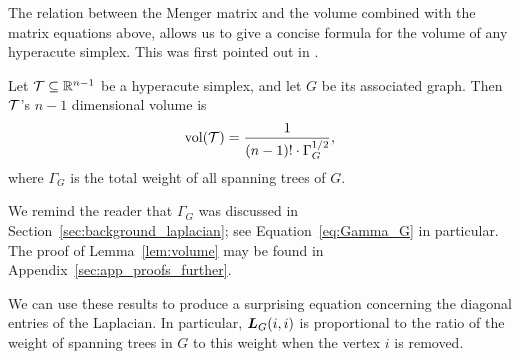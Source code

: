 The relation between the Menger matrix and the volume combined with the matrix equations above, allows us to give a concise formula for the volume of any hyperacute simplex. This was first pointed out in \cite{van2017pseudoinverse}. 

\begin{lemma}
	\label{lem:volume}
	Let $\mathcal{T}\subseteq\mathbb{R}^{n-1}$ be a hyperacute simplex, and let $G$ be its associated graph. Then $\mathcal{T}$'s $n-1$ dimensional volume is 
	\begin{equation}
	\label{eq:vol(T)}
	\textnormal{vol}(\mathcal{T}) = \frac{1}{(n-1)!\cdot \Gamma_G^{1/2}},
	\end{equation}
	where $\Gamma_G$ is the total weight of all spanning  trees of $G$. 
\end{lemma}

We remind the reader that $\Gamma_G$ was discussed in  Section~\ref{sec:background_laplacian}; see  Equation~\ref{eq:Gamma_G}  in particular. The proof of Lemma~\ref{lem:volume} may  be  found in Appendix~\ref{sec:app_proofs_further}.   


We can use these results to produce a surprising equation concerning  the diagonal entries of the Laplacian. In particular, $\vb*{L}_G(i,i)$ is proportional to the ratio of the weight of  spanning trees in $G$ to this weight when the vertex $i$ is removed. 

